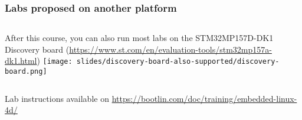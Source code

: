 \begin{frame}
\frametitle{Labs proposed on another platform}
  \begin{columns}
    After this course, you can also run most labs on the STM32MP157D-DK1 Discovery board
    (\url{https://www.st.com/en/evaluation-tools/stm32mp157a-dk1.html})
    \texttt{[image: slides/discovery-board-also-supported/discovery-board.png]}
  \end{columns}
  \vspace{1cm}
  Lab instructions available on
  \url{https://bootlin.com/doc/training/embedded-linux-4d/}
\end{frame}
